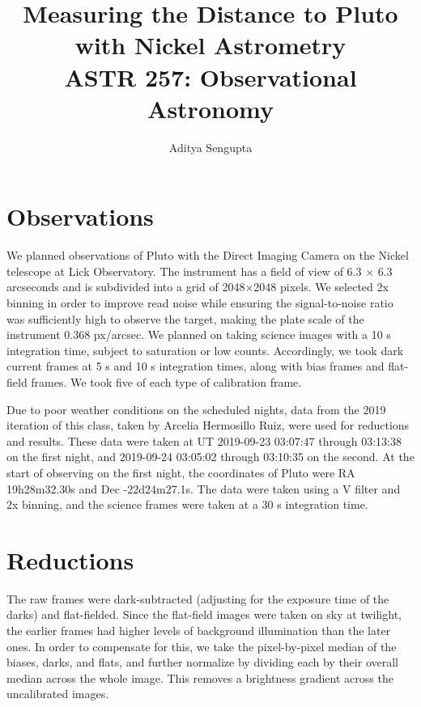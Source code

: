 \documentclass{article}
\title{Measuring the Distance to Pluto with Nickel Astrometry \\ ASTR 257: Observational Astronomy}
\author{Aditya Sengupta}
\begin{document}
    \maketitle
    \section{Observations}

    We planned observations of Pluto with the Direct Imaging Camera on the Nickel telescope at Lick Observatory. The instrument has a field of view of 6.3 $\times$ 6.3 arcseconds and is subdivided into a grid of 2048$\times$2048 pixels. We selected 2x binning in order to improve read noise while ensuring the signal-to-noise ratio was sufficiently high to observe the target, making the plate scale of the instrument 0.368 px/arcsec. We planned on taking science images with a 10 s integration time, subject to saturation or low counts. Accordingly, we took dark current frames at 5 s and 10 s integration times, along with bias frames and flat-field frames. We took five of each type of calibration frame.

    Due to poor weather conditions on the scheduled nights, data from the 2019 iteration of this class, taken by Arcelia Hermosillo Ruiz, were used for reductions and results. These data were taken at UT 2019-09-23 03:07:47 through 03:13:38 on the first night, and 2019-09-24 03:05:02 through 03:10:35 on the second. At the start of observing on the first night, the coordinates of Pluto were RA 19h28m32.30s and Dec -22d24m27.1s. The data were taken using a V filter and 2x binning, and the science frames were taken at a 30 s integration time.

    \section{Reductions}

    The raw frames were dark-subtracted (adjusting for the exposure time of the darks) and flat-fielded. Since the flat-field images were taken on sky at twilight, the earlier frames had higher levels of background illumination than the later ones. In order to compensate for this, we take the pixel-by-pixel median of the biases, darks, and flats, and further normalize by dividing each by their overall median across the whole image. This removes a brightness gradient across the uncalibrated images. 
\end{document}
